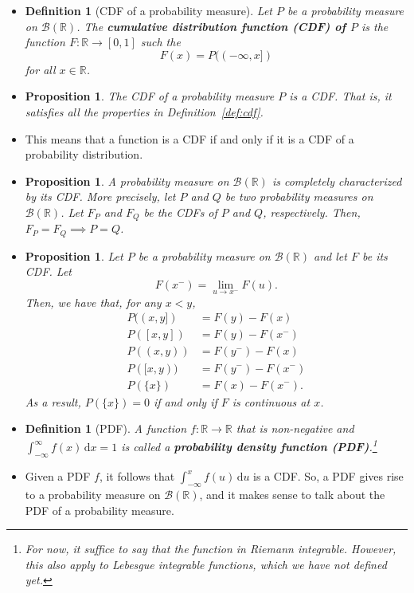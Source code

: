 \documentclass[10pt]{article}
\newtheorem{definition}[lemma]{Definition}
\newtheorem{proposition}[lemma]{Proposition}
\numberwithin{lemma}{section}
\newcommand{\dee}{\mathrm{d}}
\newcommand{\mcal}[1]{\mathcal{#1}}
\newcommand{\Real}{\mathbb{R}}
\begin{document}
\begin{itemize}
  \item \begin{definition}[CDF of a probability measure]
    Let $P$ be a probability measure on $\mcal{B}(\Real)$. The {\bf cumulative distribution function (CDF) of $P$} is the function $F: \Real \rightarrow [0,1]$ such the $$F(x) = P((-\infty,x])$$ for all $x \in \Real$.  
  \end{definition}

  \item \begin{proposition}
    The CDF of a probability measure $P$ is a CDF. That is, it satisfies all the properties in Definition~\ref{def:cdf}. 
  \end{proposition}

  \item This means that a function is a CDF if and only if it is a CDF of a probability distribution.

  \item \begin{proposition}
    A probability measure on $\mcal{B}(\Real)$ is completely characterized by its CDF. More precisely, let $P$ and $Q$ be two probability measures on $\mcal{B}(\Real)$. Let $F_P$ and $F_Q$ be the CDFs of $P$ and $Q$, respectively. Then, $F_P = F_Q \implies P = Q$.
  \end{proposition}

  \item \begin{proposition}
    Let $P$ be a probability measure on $\mcal{B}(\Real)$ and let $F$ be its CDF. Let $$F(x^-) = \lim_{u \rightarrow x^-} F(u).$$
    Then, we have that, for any $x < y$,
    \begin{align*}
      P((x,y]) &= F(y) - F(x) \\
      P([x,y]) &= F(y) - F(x^-) \\
      P((x,y)) &= F(y^-) - F(x) \\
      P([x,y)) &= F(y^-) - F(x^-) \\
      P(\{ x \}) &= F(x) - F(x^-).
    \end{align*}
    As a result, $P(\{x\}) = 0$ if and only if $F$ is continuous at $x$.
  \end{proposition}

  \item \begin{definition}[PDF]
    A function $f: \Real \rightarrow \Real$ that is non-negative and $\int_{-\infty}^\infty f(x)\, \dee x = 1$ is called a {\bf probability density function (PDF)}.\footnote{For now, it suffice to say that the function in Riemann integrable. However, this also apply to Lebesgue integrable functions, which we have not defined yet.} 
  \end{definition}

  \item Given a PDF $f$, it follows that $\int_{-\infty}^x f(u)\, \dee u$ is a CDF. So, a PDF gives rise to a probability measure on $\mcal{B}(\Real)$, and it makes sense to talk about the PDF of a probability measure.
\end{itemize}
\end{document}
